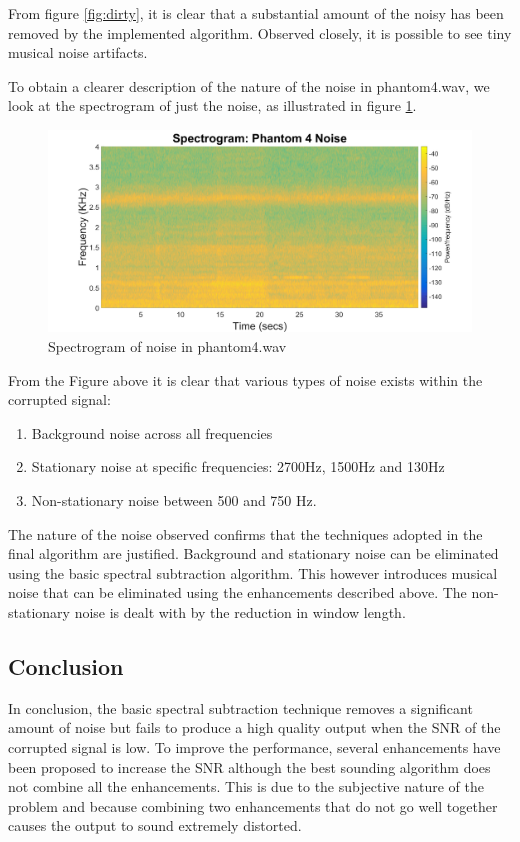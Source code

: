 \documentclass[a4paper,pra,twocolumn,10pt,aps,longbibliography,nobalancelastpage]{revtex4-1}
\begin{document}
From figure \ref{fig:dirty}, it is clear that a substantial amount of the noisy has been removed by the implemented algorithm. Observed closely, it is possible to see tiny musical noise artifacts. 

To obtain a clearer description of the nature of the noise in phantom4.wav, we look at the spectrogram of just the noise, as illustrated in figure \ref{fig:noise}.

\begin{figure}[H]
    \includegraphics[width=\columnwidth]{final_ph4_noise}
    \caption{Spectrogram of noise in phantom4.wav}
    \label{fig:noise}
\end{figure}

From the Figure above it is clear that various types of noise exists within the corrupted signal:
\begin{enumerate}
    \item Background noise across all frequencies
    \item Stationary noise at specific frequencies: 2700Hz, 1500Hz and 130Hz
    \item Non-stationary noise between 500 and 750 Hz.
\end{enumerate}

The nature of the noise observed confirms that the techniques adopted in the final algorithm are justified. Background and stationary noise can be eliminated using the basic spectral subtraction algorithm. This however introduces musical noise that can be eliminated using the enhancements described above. The non-stationary noise is dealt with by the reduction in window length.

\subsection{Conclusion}

In conclusion, the basic spectral subtraction technique removes a significant amount of noise but fails to produce a high quality output when the SNR of the corrupted signal is low. To improve the performance, several enhancements have been proposed to increase the SNR although the best sounding algorithm does not combine all the enhancements. This is due to the subjective nature of the problem and because combining two enhancements that do not go well together causes the output to sound extremely distorted. 
\end{document}
